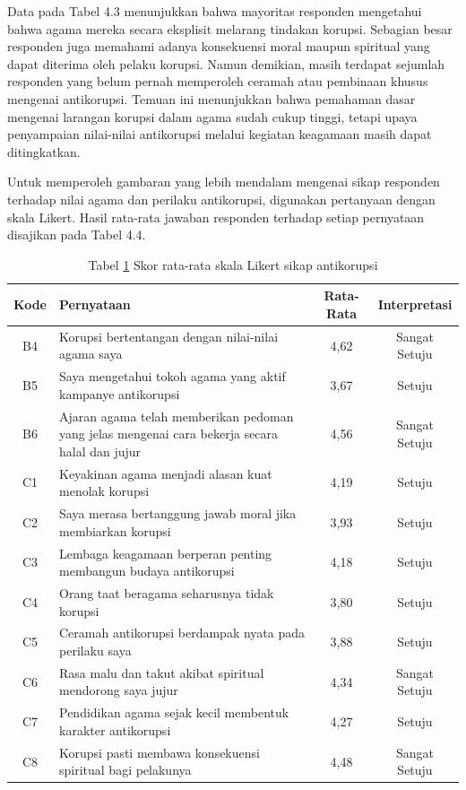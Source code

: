 Data pada Tabel 4.3 menunjukkan bahwa mayoritas responden mengetahui bahwa agama mereka secara eksplisit melarang tindakan korupsi. Sebagian besar responden juga memahami adanya konsekuensi moral maupun spiritual yang dapat diterima oleh pelaku korupsi. Namun demikian, masih terdapat sejumlah responden yang belum pernah memperoleh ceramah atau pembinaan khusus mengenai antikorupsi. Temuan ini menunjukkan bahwa pemahaman dasar mengenai larangan korupsi dalam agama sudah cukup tinggi, tetapi upaya penyampaian nilai-nilai antikorupsi melalui kegiatan keagamaan masih dapat ditingkatkan.

Untuk memperoleh gambaran yang lebih mendalam mengenai sikap responden terhadap nilai agama dan perilaku antikorupsi, digunakan pertanyaan dengan skala Likert. Hasil rata-rata jawaban responden terhadap setiap pernyataan disajikan pada Tabel 4.4. 

\begin{table}[H]
    \centering
    \captionsetup{labelformat=empty}
    \caption[Skor rata-rata skala Likert sikap antikorupsi]{Tabel \ref{tab:Tabelhasilkuesioner} Skor rata-rata skala Likert sikap antikorupsi}
    \label{tab:Tabelhasilkuesioner}
    \begin{tabular}{ |c|p{8cm}|c|c| } 
    \hline
    \textbf{Kode} & \textbf{Pernyataan} & \textbf{Rata-Rata} & \textbf{Interpretasi} \\
    \hline
    B4 & Korupsi bertentangan dengan nilai-nilai agama saya & 4,62 & Sangat Setuju \\
    \hline
    B5 & Saya mengetahui tokoh agama yang aktif kampanye antikorupsi & 3,67 & Setuju \\
    \hline
    B6 & Ajaran agama telah memberikan pedoman yang jelas mengenai cara bekerja secara halal dan jujur & 4,56 & Sangat Setuju \\
    \hline
    C1 & Keyakinan agama menjadi alasan kuat menolak korupsi & 4,19 & Setuju \\
    \hline
    C2 & Saya merasa bertanggung jawab moral jika membiarkan korupsi & 3,93 & Setuju \\
    \hline
    C3 & Lembaga keagamaan berperan penting membangun budaya antikorupsi & 4,18 & Setuju \\
    \hline
    C4 & Orang taat beragama seharusnya tidak korupsi & 3,80 & Setuju \\
    \hline
    C5 & Ceramah antikorupsi berdampak nyata pada perilaku saya & 3,88 & Setuju \\
    \hline
    C6 & Rasa malu dan takut akibat spiritual mendorong saya jujur & 4,34 & Sangat Setuju \\
    \hline
    C7 & Pendidikan agama sejak kecil membentuk karakter antikorupsi & 4,27 & Setuju \\
    \hline
    C8 & Korupsi pasti membawa konsekuensi spiritual bagi pelakunya & 4,48 & Sangat Setuju \\
    \hline
    \end{tabular}
\end{table}

